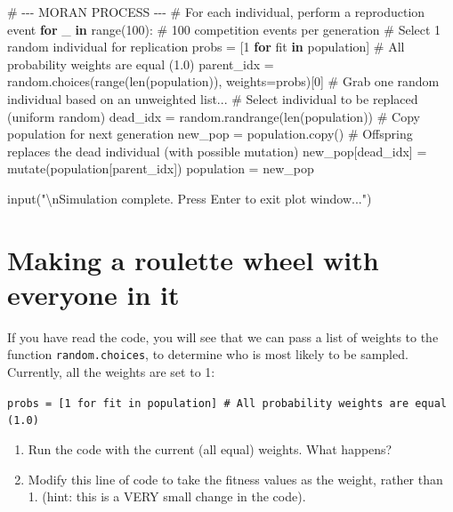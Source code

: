 \documentclass[
  letterpaper,
  DIV=11,
  numbers=noendperiod]{scrreprt}
\newenvironment{Shaded}{\begin{snugshade}}{\end{snugshade}}
\newcommand{\BuiltInTok}[1]{\textcolor[rgb]{0.00,0.23,0.31}{#1}}
\newcommand{\CharTok}[1]{\textcolor[rgb]{0.13,0.47,0.30}{#1}}
\newcommand{\CommentTok}[1]{\textcolor[rgb]{0.37,0.37,0.37}{#1}}
\newcommand{\ControlFlowTok}[1]{\textcolor[rgb]{0.00,0.23,0.31}{\textbf{#1}}}
\newcommand{\DecValTok}[1]{\textcolor[rgb]{0.68,0.00,0.00}{#1}}
\newcommand{\KeywordTok}[1]{\textcolor[rgb]{0.00,0.23,0.31}{\textbf{#1}}}
\newcommand{\NormalTok}[1]{\textcolor[rgb]{0.00,0.23,0.31}{#1}}
\newcommand{\OperatorTok}[1]{\textcolor[rgb]{0.37,0.37,0.37}{#1}}
\newcommand{\StringTok}[1]{\textcolor[rgb]{0.13,0.47,0.30}{#1}}
\providecommand{\tightlist}{%
  \setlength{\itemsep}{0pt}\setlength{\parskip}{0pt}}\usepackage{longtable,booktabs,array}
\theoremstyle{definition}
\theoremstyle{remark}
\begin{document}
\begin{tcolorbox}
\begin{Shaded}
\begin{Highlighting}[]
    \CommentTok{\# {-}{-}{-} MORAN PROCESS {-}{-}{-}}
    \CommentTok{\# For each individual, perform a reproduction event}
    \ControlFlowTok{for}\NormalTok{ \_ }\KeywordTok{in} \BuiltInTok{range}\NormalTok{(}\DecValTok{100}\NormalTok{):  }\CommentTok{\# 100 competition events per generation}
        \CommentTok{\# Select 1 random individual for replication}
\NormalTok{        probs }\OperatorTok{=}\NormalTok{ [}\DecValTok{1} \ControlFlowTok{for}\NormalTok{ fit }\KeywordTok{in}\NormalTok{ population] }\CommentTok{\# All probability weights are equal (1.0)}
\NormalTok{        parent\_idx }\OperatorTok{=}\NormalTok{ random.choices(}\BuiltInTok{range}\NormalTok{(}\BuiltInTok{len}\NormalTok{(population)), weights}\OperatorTok{=}\NormalTok{probs)[}\DecValTok{0}\NormalTok{] }\CommentTok{\# Grab one random individual based on an unweighted list...}
        \CommentTok{\# Select individual to be replaced (uniform random)}
\NormalTok{        dead\_idx }\OperatorTok{=}\NormalTok{ random.randrange(}\BuiltInTok{len}\NormalTok{(population))}
        \CommentTok{\# Copy population for next generation}
\NormalTok{        new\_pop }\OperatorTok{=}\NormalTok{ population.copy()}
        \CommentTok{\# Offspring replaces the dead individual (with possible mutation)}
\NormalTok{        new\_pop[dead\_idx] }\OperatorTok{=}\NormalTok{ mutate(population[parent\_idx])}
\NormalTok{        population }\OperatorTok{=}\NormalTok{ new\_pop}

\BuiltInTok{input}\NormalTok{(}\StringTok{"}\CharTok{\textbackslash{}n}\StringTok{Simulation complete. Press Enter to exit plot window..."}\NormalTok{)}
\end{Highlighting}
\end{Shaded}

\end{tcolorbox}

\section{Making a roulette wheel with everyone in
it}\label{making-a-roulette-wheel-with-everyone-in-it}

If you have read the code, you will see that we can pass a list of
weights to the function \texttt{random.choices}, to determine who is
most likely to be sampled. Currently, all the weights are set to 1:

\texttt{probs\ =\ {[}1\ for\ fit\ in\ population{]}\ \#\ All\ probability\ weights\ are\ equal\ (1.0)}

\begin{enumerate}
\def\labelenumi{\alph{enumi}.}
\tightlist
\item
  Run the code with the current (all equal) weights. What happens?
\item
  Modify this line of code to take the fitness values as the weight,
  rather than 1. (hint: this is a VERY small change in the code).
\end{enumerate}
\end{document}
